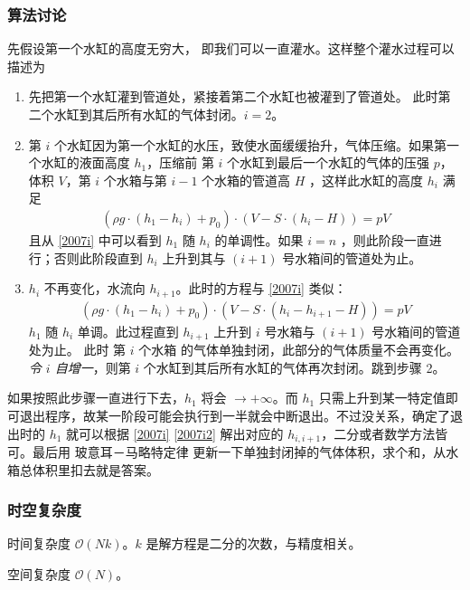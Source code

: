 			\subsubsection{算法讨论}
				先假设第一个水缸的高度无穷大，%
				即我们可以一直灌水。这样整个灌水过程可以描述为
				\begin{enumerate}
					\item 先把第一个水缸灌到管道处，紧接着第二个水缸也被灌到了管道处。
						此时第二个水缸到其后所有水缸的气体封闭。$i = 2$。
					\item 第 $i$ 个水缸因为第一个水缸的水压，致使水面缓缓抬升，气体压缩。如果第一个水缸的液面高度 $h_1$，压缩前 第 $i$ 个水缸到最后一个水缸的气体的压强 $p$，体积 $V$，第 $i$ 个水箱与第 $i - 1$ 个水箱的管道高 $H$
					，这样此水缸的高度 $h_i$ 满足
						\begin{align}
							(\rho g \cdot (h_1 - h_i) + p_0) \cdot (V - S \cdot (h_i - H)) = p V \label{2007i}
						\end{align}
					且从 \eqref{2007i} 中可以看到 $h_1$ 随 $h_i$ 的单调性。如果 $i = n$ ，则此阶段一直进行；否则此阶段直到 $h_i$ 上升到其与 $(i + 1)$ 号水箱间的管道处为止。
					\item $h_i$ 不再变化，水流向 $h_{i+1}$。此时的方程与  \eqref{2007i} 类似：
						\begin{align}
							(\rho g \cdot (h_1 - h_i) + p_0) \cdot (V - S \cdot (h_i - h_{i+1} - H)) = p V \label{2007i2}
						\end{align}
						$h_1$ 随 $h_i$ 单调。此过程直到 $h_{i+1}$ 上升到 $i$ 号水箱与 $(i + 1)$ 号水箱间的管道处为止。
						此时 第 $i$ 个水箱 的气体单独封闭，此部分的气体质量不会再变化。\emph{令 $i$ 自增一}，则第 $i$ 个水缸到其后所有水缸的气体再次封闭。跳到步骤 2。
				\end{enumerate}
				
				如果按照此步骤一直进行下去，$h_1$ 将会 $\to + \infty$。而 $h_1$ 只需上升到某一特定值即可退出程序，故某一阶段可能会执行到一半就会中断退出。不过没关系，确定了退出时的 $h_1$ 就可以根据  \eqref{2007i} \eqref{2007i2} 解出对应的 $h_{i, i+1}$，二分或者数学方法皆可。最后用 玻意耳－马略特定律 更新一下单独封闭掉的气体体积，求个和，从水箱总体积里扣去就是答案。
			
			\subsubsection{时空复杂度}
				时间复杂度 $\mathcal{O}\left(N k\right)$。$k$ 是解方程是二分的次数，与精度相关。
					
				空间复杂度 $\mathcal{O}\left(N\right)$。
				
